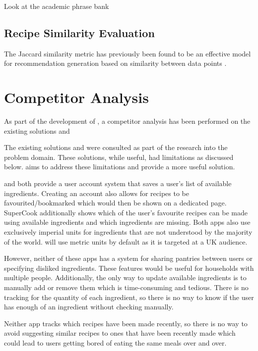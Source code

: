 {    Look at the academic phrase bank
}

\subsection{Recipe Similarity Evaluation}
The Jaccard similarity metric has previously been found to be an effective model for recommendation generation based on similarity
between data points \cite{jeswani_extent_2021}.

\section{Competitor Analysis}
\label{sec:competitor_analysis}
As part of the development of \chef{}, a competitor analysis has been performed on the existing solutions \cite{myfridgefood_myfridgefood_nodate} and \cite{supercook_supercook_nodate}

The existing solutions \cite{myfridgefood_myfridgefood_nodate} and \cite{supercook_supercook_nodate} were consulted
as part of the research into the problem domain. These solutions, while useful, had limitations as discussed below.
\chef{} aims to address these limitations and provide a more useful solution.

\cite{myfridgefood_myfridgefood_nodate} and \cite{supercook_supercook_nodate} both provide a user account system
that saves a user's list of available ingredients. Creating an account also allows for recipes to be favourited/bookmarked
which would then be shown on a dedicated page. SuperCook additionally shows which of the user's favourite recipes
can be made using available ingredients and which ingredients are missing. Both apps also use exclusively imperial
units for ingredients that are not understood by the majority of the world. \chef{} will use metric units by default
as it is targeted at a UK audience.

However, neither of these apps has a system for sharing pantries between users or specifying disliked ingredients. These features would be useful for households with multiple people.
Additionally, the only way to update available ingredients is to manually add or remove them which is time-consuming and tedious. There is no tracking for the quantity of
each ingredient, so there is no way to know if the user has enough of an ingredient without checking manually.

Neither app tracks which recipes have been made recently, so there is no way to avoid suggesting similar recipes to ones that have been recently made which could lead to
users getting bored of eating the same meals over and over.

